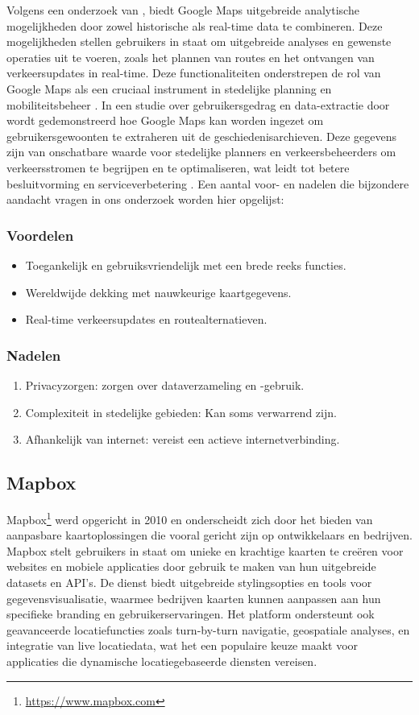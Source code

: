Volgens een onderzoek van \textcite{Mehta2019}, biedt Google Maps uitgebreide analytische mogelijkheden door zowel historische als real-time data te combineren. Deze mogelijkheden stellen gebruikers in staat om uitgebreide analyses en gewenste operaties uit te voeren, zoals het plannen van routes en het ontvangen van verkeersupdates in real-time. Deze functionaliteiten onderstrepen de rol van Google Maps als een cruciaal instrument in stedelijke planning en mobiliteitsbeheer \autocite{Mehta2019}. In een studie over gebruikersgedrag en data-extractie door \textcite{Sardianos2018} wordt gedemonstreerd hoe Google Maps kan worden ingezet om gebruikersgewoonten te extraheren uit de geschiedenisarchieven. Deze gegevens zijn van onschatbare waarde voor stedelijke planners en verkeersbeheerders om verkeersstromen te begrijpen en te optimaliseren, wat leidt tot betere besluitvorming en serviceverbetering \autocite{Sardianos2018}. Een aantal voor- en nadelen die bijzondere aandacht vragen in ons onderzoek worden hier opgelijst:

\subsubsection*{Voordelen}
\begin{itemize}
    \item Toegankelijk en gebruiksvriendelijk met een brede reeks functies.
    \item Wereldwijde dekking met nauwkeurige kaartgegevens.
    \item Real-time verkeersupdates en routealternatieven.
\end{itemize}
\subsubsection*{Nadelen}
\begin{enumerate}
    \item Privacyzorgen: zorgen over dataverzameling en -gebruik.
    \item Complexiteit in stedelijke gebieden: Kan soms verwarrend zijn.
    \item Afhankelijk van internet: vereist een actieve internetverbinding.
\end{enumerate}

\subsection{Mapbox}
Mapbox\footnote{\url{https://www.mapbox.com}} werd opgericht in 2010 en onderscheidt zich door het bieden van aanpasbare kaartoplossingen die vooral gericht zijn op ontwikkelaars en bedrijven. Mapbox stelt gebruikers in staat om unieke en krachtige kaarten te creëren voor websites en mobiele applicaties door gebruik te maken van hun uitgebreide datasets en API's. De dienst biedt uitgebreide stylingsopties en tools voor gegevensvisualisatie, waarmee bedrijven kaarten kunnen aanpassen aan hun specifieke branding en gebruikerservaringen. Het platform ondersteunt ook geavanceerde locatiefuncties zoals turn-by-turn navigatie, geospatiale analyses, en integratie van live locatiedata, wat het een populaire keuze maakt voor applicaties die dynamische locatiegebaseerde diensten vereisen. 

